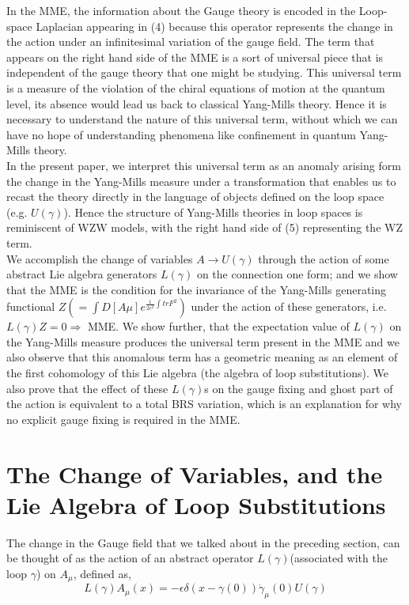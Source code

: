 \documentclass[a4paper,12]{article}
\begin{document}
In the MME, the information about the Gauge theory is encoded in the
Loop-space Laplacian appearing in (4) because this  
operator
represents the change in the action under an infinitesimal variation of 
the
gauge field. The term that appears on the right hand side of the MME is a
sort of universal piece that is independent of the gauge theory that one  
might be studying. This universal term is a measure of the violation of 
the chiral equations of motion at the quantum level, its absence would 
lead us back to classical Yang-Mills theory. Hence it is  
necessary to understand the nature of this universal term, without which 
we can have no hope of understanding phenomena like confinement in 
quantum Yang-Mills theory.\\

In the present paper, we interpret this universal term as an anomaly 
\cite{Fujikawa} 
arising form the change in the Yang-Mills measure under a transformation 
that enables us to recast the theory directly in the language of objects 
defined on the loop space (e.g. $U(\gamma )$). Hence the structure of 
Yang-Mills theories in 
loop spaces is reminiscent of WZW models, with the right hand side of (5) 
representing the WZ term.\\

We accomplish the change of variables $A \rightarrow U(\gamma )$ through 
the action of some abstract Lie algebra generators $L(\gamma )$ on the 
connection one form; and we 
show that the MME is the condition for the invariance of the Yang-Mills 
generating functional $Z (= \int D[A\mu ] e ^{\frac{1}{2e^2} \int tr 
F^2})$ under the action of these generators, i.e. 
$L(\gamma ) Z = 0 \Rightarrow $ MME. We show further, that the expectation 
value of $L(\gamma )$ on the Yang-Mills measure produces the universal 
term present in the MME and we also observe that this anomalous term has a 
geometric meaning as an element of the first cohomology of this Lie 
algebra (the algebra of loop substitutions). We also prove that the effect 
of these $L(\gamma )$s on the gauge 
fixing and ghost part of the action is equivalent to a total BRS 
variation, which is an explanation for why no explicit gauge fixing is 
required in the MME.

\section{The Change of Variables, and the Lie Algebra of Loop 
Substitutions} 

The change in the Gauge field that we talked about in the preceding 
section, can be thought of as the action of  
 an abstract operator $L(\gamma )$(associated with the loop $\gamma $) 
on 
$A_\mu $, defined as,
\begin{equation}
L(\gamma )A_\mu(x) = -\epsilon\delta (x - \gamma (0))\dot{\gamma }_\mu 
(0)U(\gamma )
\end{equation}
\end{document}
